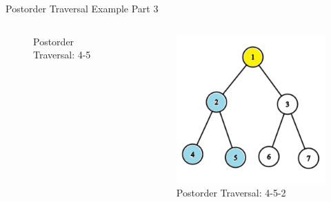 \documentclass[aspectratio=169]{beamer}%
\begin{document}
\begin{frame}{Postorder Traversal Example Part 3}
\begin{columns}
\begin{column}{0.32\textwidth}
\begin{figure}
                \caption{Postorder Traversal: 4-5}
            \end{figure}
        \end{column}
        \hfill
        \begin{column}{0.32\textwidth}
            \begin{figure}
                \centering
                \includegraphics[width = .9\linewidth]{tree-post 9.png}
                \caption{Postorder Traversal: 4-5-2}
            \end{figure}
        \end{column}
    \end{columns}
\end{frame}
\end{document}
